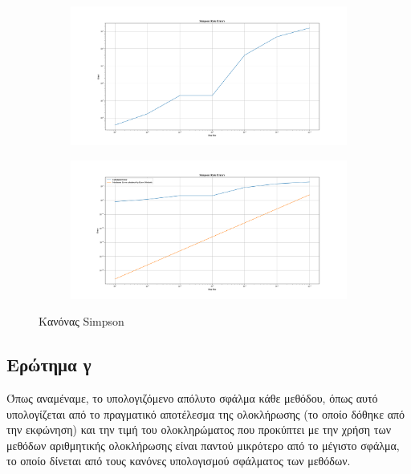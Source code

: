 \documentclass{article}
\begin{document}
\vspace*{\fill}
\newpage
\begin{figure}[H]
    \centering	
	\begin{adjustbox}{center}
		\begin{subfigure}[c]{.8\textwidth}    
			\includegraphics[width=1\textwidth,height=\textheight,keepaspectratio]{media/1/Figure_7.png}
		\end{subfigure}%

	\begin{subfigure}[c]{.8\textwidth}    
			\includegraphics[width=1\textwidth,height=\textheight,keepaspectratio]{media/1/Figure_8.png}
		\end{subfigure}%
	\end{adjustbox}

\caption{Κανόνας \foreignlanguage{english}{Simpson}}
\label{(Simpson_Rule)}
\end{figure}

\vspace*{\fill}
\subsection{Ερώτημα γ}
Όπως αναμέναμε, το υπολογιζόμενο απόλυτο σφάλμα κάθε μεθόδου, όπως αυτό υπολογίζεται από το πραγματικό αποτέλεσμα της ολοκλήρωσης (το οποίο δόθηκε από την εκφώνηση) και την τιμή του ολοκληρώματος που προκύπτει με την χρήση των μεθόδων αριθμητικής ολοκλήρωσης είναι παντού μικρότερο από το μέγιστο σφάλμα, το οποίο δίνεται από τους κανόνες υπολογισμού σφάλματος των μεθόδων. 
\vspace*{\fill}
\newpage
\end{document}
